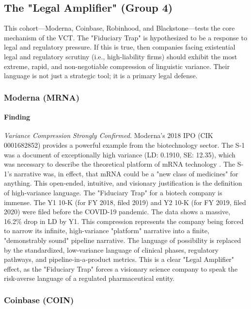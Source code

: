 \documentclass[12pt, letterpaper]{article}
\begin{document}
\subsection{The "Legal Amplifier" (Group 4)}
This cohort—Moderna, Coinbase, Robinhood, and Blackstone—tests the core mechanism of the VCT. The "Fiduciary Trap" is hypothesized to be a response to legal and regulatory pressure. If this is true, then companies facing existential legal and regulatory scrutiny (i.e., high-liability firms) should exhibit the most extreme, rapid, and non-negotiable compression of linguistic variance. Their language is not just a strategic tool; it is a primary legal defense.

\subsubsection{Moderna (MRNA)}
\paragraph{Finding} \textit{Variance Compression Strongly Confirmed.}
Moderna's 2018 IPO (CIK 0001682852) provides a powerful example from the biotechnology sector. The S-1 was a document of exceptionally high variance (LD: 0.1910, SE: 12.35), which was necessary to describe the theoretical platform of mRNA technology \cite{key19}. The S-1's narrative was, in effect, that mRNA could be a "new class of medicines" for anything. This open-ended, intuitive, and visionary justification is the definition of high-variance language. The "Fiduciary Trap" for a biotech company is immense. The Y1 10-K (for FY 2018, filed 2019) \cite{key18} and Y2 10-K (for FY 2019, filed 2020) \cite{key52} were filed before the COVID-19 pandemic. The data shows a massive, 16.2\% drop in LD by Y1. This compression represents the company being forced to narrow its infinite, high-variance "platform" narrative into a finite, "demonstrably sound" pipeline narrative. The language of possibility is replaced by the standardized, low-variance language of clinical phases, regulatory pathways, and pipeline-in-a-product metrics. This is a clear "Legal Amplifier" effect, as the "Fiduciary Trap" forces a visionary science company to speak the risk-averse language of a regulated pharmaceutical entity.

\subsubsection{Coinbase (COIN)}
\end{document}

